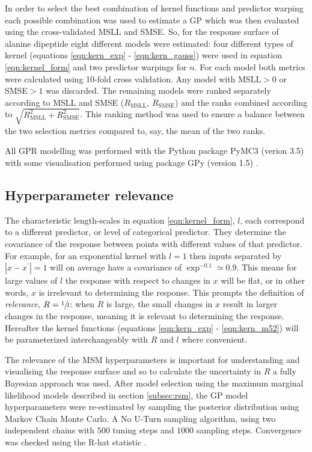 In order to select the best combination of kernel functions and predictor warping each possible combination was used to estimate a GP which was then evaluated using the cross-validated MSLL and SMSE. So, for the response surface of alanine dipeptide eight different models were estimated: four different types of kernel (equations \ref{eqn:kern_exp} - \ref{eqn:kern_gauss}) were used in equation \ref{eqn:kernel_form} and two predictor warpings for $n$. For each model both metrics were calculated using 10-fold cross validation. Any model with MSLL$ > 0$ or SMSE$ > 1$ was discarded. The remaining models were ranked separately according to MSLL and SMSE ($R_{\mathrm{MSLL}}$, $R_{\mathrm{SMSE}}$) and the ranks combined according to $\sqrt{R_{\mathrm{MSLL}}^2 + R_{\mathrm{SMSE}}^2}$. This ranking method was used to ensure a balance between the two selection metrics compared to, say, the mean of the two ranks.  

All GPR modelling was performed with the Python package PyMC3 (verion 3.5) \cite{salvatierProbabilisticProgrammingPython2016} with some visualisation performed using package GPy (version 1.5) \cite{gpy2014}. 

\subsection{Hyperparameter relevance}\label{subsec:meth_rel}
The characteristic length-scales in equation \ref{eqn:kernel_form}, $l$, each correspond to a different predictor, or level of categorical predictor. They determine the covariance of the response between points with different values of that predictor. For example, for an exponential kernel with $l=1$ then inputs separated by $|x-x^{\prime}|= 1$ will on average have a covariance of $\exp^{-0.1}\simeq 0.9$. This means for large values of $l$ the response with respect to changes in $x$ will be flat, or in other words, $x$ is irrelevant to determining the response. This prompts the definition of \emph{relevance}, $R = \sfrac{1}{l}$:\cite{bernardo1998regression}\cite{bergstrajamesbergstraRandomSearchHyperParameter2012} when $R$ is large, the small changes in $x$ result in larger changes in the response, meaning it is relevant to determining the response. Hereafter the kernel functions (equations \ref{eqn:kern_exp} - \ref{eqn:kern_m52}) will be parameterized interchangeably with $R$ and $l$ where convenient.  

The relevance of the MSM hyperparameters is important for understanding and visualising the response surface and so to calculate the uncertainty in $R$ a fully Bayesian approach was used. After model selection using the maximum marginal likelihood models described in section \ref{subsec:rsm}, the GP model hyperparameters were re-estimated by sampling the posterior distribution using Markov Chain Monte Carlo. A No U-Turn sampling algorithm, using two independent chains with $500$ tuning steps and $1000$ sampling steps. Convergence was checked using the R-hat statistic \cite{vehtariRanknormalizationFoldingLocalization2020}. 

